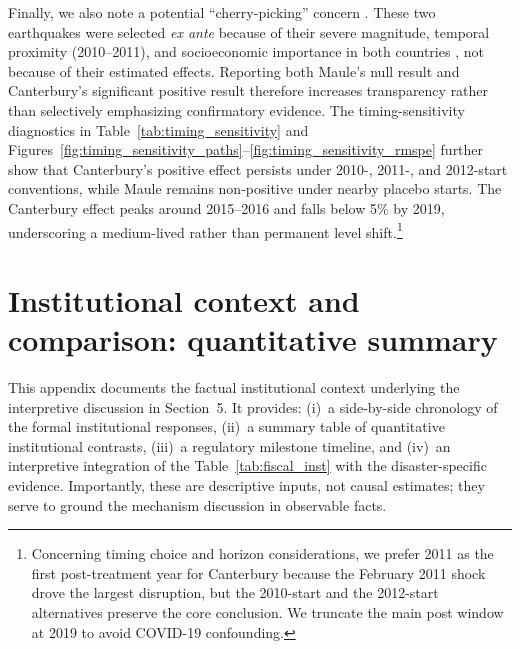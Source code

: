 \documentclass[12pt]{article}
\begin{document}
Finally, we also note a potential ``cherry-picking'' concern \autocite{ferman2020cherry}. These two earthquakes were selected \textit{ex ante} because of their severe magnitude, temporal proximity (2010--2011), and socioeconomic importance in both countries \parencite{dussaillant2014trust, cardenasjiron2012chilean, eqc2017annual, miller2013estimating}, not because of their estimated effects. Reporting both Maule's null result and Canterbury's significant positive result therefore increases transparency rather than selectively emphasizing confirmatory evidence. The timing-sensitivity diagnostics in Table~\ref{tab:timing_sensitivity} and Figures~\ref{fig:timing_sensitivity_paths}--\ref{fig:timing_sensitivity_rmspe} further show that Canterbury's positive effect persists under 2010-, 2011-, and 2012-start conventions, while Maule remains non-positive under nearby placebo starts. The Canterbury effect peaks around 2015--2016 and falls below 5\% by 2019, underscoring a medium-lived rather than permanent level shift.\footnote{Concerning timing choice and horizon considerations, we prefer 2011 as the first post-treatment year for Canterbury because the February 2011 shock drove the largest disruption, but the 2010-start and the 2012-start alternatives preserve the core conclusion. We truncate the main post window at 2019 to avoid COVID-19 confounding.}

\newpage

%

\renewcommand{\thetable}{E.\arabic{table}}
\setcounter{table}{13}
\setcounter{subsection}{0}

\section{Institutional context and comparison: quantitative summary}

This appendix documents the factual institutional context underlying the interpretive discussion in Section~5. It provides: (i)~a side-by-side chronology of the formal institutional responses, (ii)~a summary table of quantitative institutional contrasts, (iii)~a regulatory milestone timeline, and (iv)~an interpretive integration of the Table~\ref{tab:fiscal_inst} with the disaster-specific evidence. Importantly, these are descriptive inputs, not causal estimates; they serve to ground the mechanism discussion in observable facts.
\end{document}
